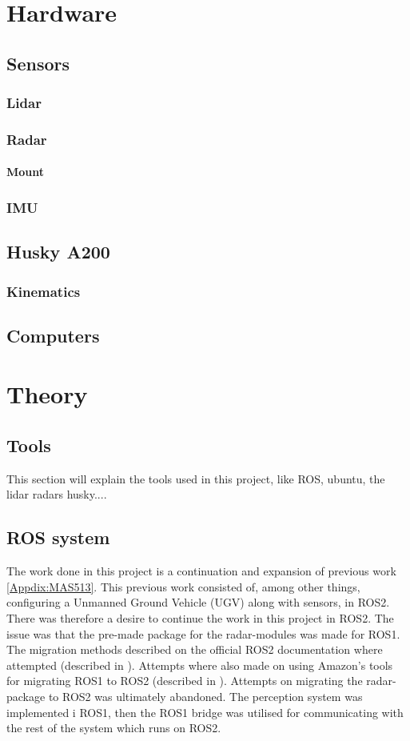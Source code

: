 \chapter{Hardware}
\section{Sensors}
\subsection{Lidar}

\subsection{Radar}
\subsubsection{Mount}
\subsection{IMU}
\section{Husky A200}
\subsection{Kinematics}
\section{Computers}


\chapter{Theory}
\section{Tools}
This section will explain the tools used in this project, like ROS, ubuntu, the lidar radars husky....
\section{ROS system}
The work done in this project is a continuation and expansion of previous work \ref{Appdix:MAS513}. This previous work consisted of, among other things, configuring a Unmanned Ground Vehicle (UGV) along with sensors, in ROS2. There was therefore a desire to continue the work in this project in ROS2. The issue was that the pre-made package for the radar-modules was made for ROS1. The migration methods described on the official ROS2 documentation where attempted (described in \cite{ROSMigrationGuide}). Attempts where also made on using Amazon's tools for migrating ROS1 to ROS2 (described in \cite{ROSMigrationGuide}). Attempts on migrating the radar-package to ROS2 was ultimately abandoned. The perception system was implemented i ROS1, then the ROS1 bridge was utilised for communicating with the rest of the system which runs on ROS2.

